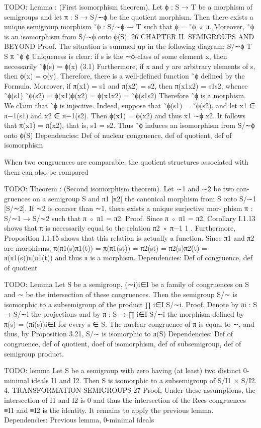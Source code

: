 {TODO: Lemma : (First isomorphism theorem). Let ϕ : S → T be a morphism
of semigroups and let π : S → S/∼ϕ be the quotient morphism. Then there exists
a unique semigroup morphism ˜ϕ : S/∼ϕ → T such that ϕ = ˜ϕ ◦ π. Moreover,
˜ϕ is an isomorphism from S/∼ϕ onto ϕ(S).
26 CHAPTER II. SEMIGROUPS AND BEYOND
Proof. The situation is summed up in the following diagram:
S/∼ϕ T
S
π
˜ϕ
ϕ
Uniqueness is clear: if s is the ∼ϕ-class of some element x, then necessarily
˜ϕ(s) = ϕ(x) (3.1)
Furthermore, if x and y are arbitrary elements of s, then ϕ(x) = ϕ(y). Therefore,
there is a well-defined function ˜ϕ defined by the Formula. Moreover, if π(x1) =
s1 and π(x2) = s2, then π(x1x2) = s1s2, whence
˜ϕ(s1) ˜ϕ(s2) = ϕ(x1)ϕ(x2) = ϕ(x1x2) = ˜ϕ(s1s2)
Therefore ˜ϕ is a morphism. We claim that ˜ϕ is injective. Indeed, suppose that
˜ϕ(s1) = ˜ϕ(s2), and let x1 ∈ π−1(s1) and x2 ∈ π−1(s2). Then ϕ(x1) = ϕ(x2)
and thus x1 ∼ϕ x2. It follows that π(x1) = π(x2), that is, s1 = s2. Thus ˜ϕ
induces an isomorphism from S/∼ϕ onto ϕ(S)
Dependencies: Def of nuclear congruence, def of quotient, def of isomorphism

When two congruences are comparable, the quotient structures associated
with them can also be compared

TODO: Theorem : (Second isomorphism theorem). Let ∼1 and ∼2 be two con-
gruences on a semigroup S and π1 [π2] the canonical morphism from S onto
S/∼1 [S/∼2]. If ∼2 is coarser than ∼1, there exists a unique surjective mor-
phism π : S/∼1 → S/∼2 such that π ◦ π1 = π2.
Proof. Since π ◦ π1 = π2, Corollary I.1.13 shows that π is necessarily equal to
the relation π2 ◦ π−1
1 . Furthermore, Proposition I.1.15 shows that this relation
is actually a function.
Since π1 and π2 are morphisms,
π(π1(s)π1(t)) = π(π1(st)) = π2(st) = π2(s)π2(t) = π(π1(s))π(π1(t))
and thus π is a morphism.
Dependencies: Def of congruence, def of quotient

TODO: Lemma
Let S be a semigroup, (∼i)i∈I be a family of congruences
on S and ∼ be the intersection of these congruences. Then the semigroup S/∼
is isomorphic to a subsemigroup of the product ∏
i∈I S/∼i.
Proof. Denote by πi : S → S/∼i the projections and by π : S → ∏
i∈I S/∼i the
morphism defined by π(s) = (πi(s))i∈I for every s ∈ S. The nuclear congruence
of π is equal to ∼, and thus, by Proposition 3.21, S/∼ is isomorphic to π(S)
Dependencies: Def of congruence, def of quotient, doef of isomorphism, def of subsemigroup, def of semigroup product. 

TODO: lemma
Let S be a semigroup with zero having (at least) two distinct
0-minimal ideals I1 and I2. Then S is isomorphic to a subsemigroup of S/I1 ×
S/I2.
4. TRANSFORMATION SEMIGROUPS 27
Proof. Under these assumptions, the intersection of I1 and I2 is 0 and thus the
intersection of the Rees congruences ≡I1 and ≡I2 is the identity. It remains to
apply the previous lemma.
Dependencies: Previous lemma, 0-minimal ideals

}
